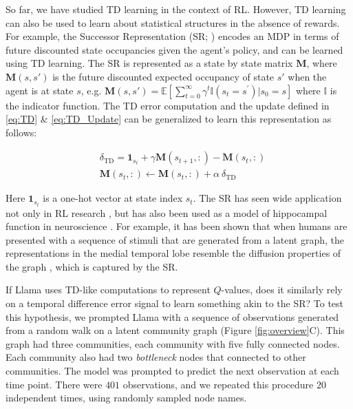 \documentclass{article} %
\newcommand{\state}{s_t}
\newcommand{\nextstate}{s_{t+1}}
\begin{document}
So far, we have studied TD learning in the context of RL. However, TD learning can also be used to learn about statistical structures in the absence of rewards. For example, the Successor Representation (SR; \citealp{dayan_improving_1993}) encodes an MDP in terms of future discounted state occupancies given the agent's policy, and can be learned using TD learning. The SR is represented as a state by state matrix $\mathbf{M}$, where $\mathbf{M}(s, s')$ is the future discounted expected occupancy of state $s'$ when the agent is at state $s$, e.g. $\mathbf{M}(s, s') = \mathbb{E}\left[\mathop{\sum }\limits_{t=0}^{\infty }{\gamma }^{t}{\mathbb{I}}({s}_{t}={s}^{{\prime} })| {s}_{0}=s\right]$ where $\mathbb{I}$ is the indicator function. The TD error computation and the update defined in \eqref{eq:TD} \& \eqref{eq:TD_Update} can be generalized to learn this representation as follows:



\begin{align}
&\delta_{\text{TD}} = \mathbf{1}_{\state} + \gamma \mathbf{M}(\nextstate, :) - \mathbf{M}(\state, :)\label{eq:SR_TD}\\
&\mathbf{M}(\state, :) \leftarrow \mathbf{M}(\state, :) + \alpha \ \delta_{\text{TD}}\label{eq:SR_TD_Update}
\end{align}


Here $\mathbf{1}_{\state}$ is a one-hot vector at state index $\state$. The SR has seen wide application not only in RL research \citep{kulkarni2016deep, barreto2017successor, machado2017eigenoption}, but has also been used as a model of hippocampal function in neuroscience \citep{garvert2023hippocampal,gershman2018successor, stachenfeld2017hippocampus, Gardner2018-fp}. For example, it has been shown that when humans are presented with a sequence of stimuli that are generated from a latent graph, the representations in the medial temporal lobe resemble the diffusion properties of the graph \citep{schapiro_neural_2013, schapiro_statistical_2016, garvert_map_2017}, which is captured by the SR.

If Llama uses TD-like computations to represent $Q$-values, does it similarly rely on a temporal difference error signal to learn something akin to the SR? To test this hypothesis, we prompted Llama with a sequence of observations generated from a random walk on a latent community graph \citep{schapiro_neural_2013} (Figure \ref{fig:overview}C). This graph had three communities, each community with five fully connected nodes. Each community also had two \emph{bottleneck} nodes that connected to other communities. The model was prompted to predict the next observation at each time point. There were $401$ observations, and we repeated this procedure $20$ independent times, using randomly sampled node names. 
\end{document}
